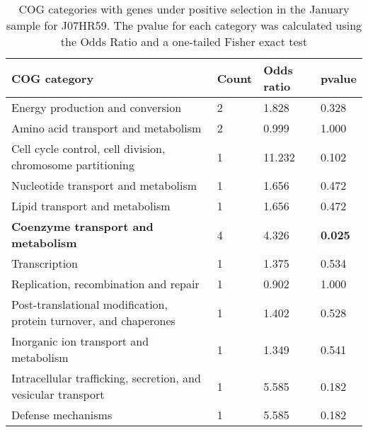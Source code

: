 \begin{table}[]
\footnotesize 
	\tabcolsep=0.11cm 
\caption{COG categories with genes under positive selection in the January sample for J07HR59. The pvalue for each category was calculated using the Odds Ratio and a one-tailed Fisher exact test \\} 
\begin{tabularx}{\textwidth}{L{6cm}R{2cm}R{2cm}R{2cm}} 
\hline 
\textbf{COG category} & \textbf{Count} & \textbf{Odds ratio} & \textbf{pvalue} \\ 
\hline 
Energy production and conversion & 2 & 1.828 & 0.328 \\ 
Amino acid transport and metabolism & 2 & 0.999 & 1.000 \\ 
Cell cycle control, cell division, chromosome partitioning & 1 & 11.232 & 0.102 \\ 
Nucleotide transport and metabolism & 1 & 1.656 & 0.472 \\ 
Lipid transport and metabolism & 1 & 1.656 & 0.472 \\ 
\textbf{Coenzyme transport and metabolism} & 4 & 4.326 & \textbf{0.025} \\ 
Transcription & 1 & 1.375 & 0.534 \\ 
Replication, recombination and repair & 1 & 0.902 & 1.000 \\ 
Post-translational modification, protein turnover, and chaperones & 1 & 1.402 & 0.528 \\ 
Inorganic ion transport and metabolism & 1 & 1.349 & 0.541 \\ 
Intracellular trafficking, secretion, and vesicular transport & 1 & 5.585 & 0.182 \\ 
Defense mechanisms & 1 & 5.585 & 0.182 \\ 
\end{tabularx} 
\label{January_COG_Selection_J07HR59} 
 \end{table} 

